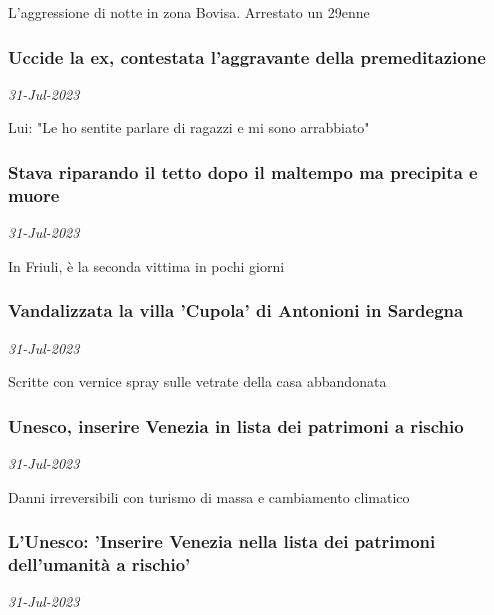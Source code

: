 L'aggressione di notte in zona Bovisa. Arrestato un 29enne
\subsubsection{Uccide la ex, contestata l'aggravante della premeditazione \href{https://www.ansa.it/sito/notizie/cronaca/2023/07/31/uccide-la-ex-contestata-laggravante-della-premeditazione_41bfe26d-d92d-487b-9baa-5a89bbd452da.html}{}}
\textit{31-Jul-2023}

Lui: "Le ho sentite parlare di ragazzi e mi sono arrabbiato"
\subsubsection{Stava riparando il tetto dopo il maltempo ma precipita e muore \href{https://www.ansa.it/sito/notizie/cronaca/2023/07/31/stava-riparando-il-tetto-dopo-il-maltempo-ma-precipita-e-muore_f71c618e-ea2d-432d-abe4-183ba84e5e6f.html}{}}
\textit{31-Jul-2023}

In Friuli, \`{e} la seconda vittima in pochi giorni
\subsubsection{Vandalizzata la villa 'Cupola' di Antonioni in Sardegna \href{https://www.ansa.it/sito/notizie/cronaca/2023/07/31/vandalizzata-la-villa-cupola-di-antonioni-in-sardegna_e3df485e-1e32-4f59-9fbf-521ad8ff5104.html}{}}
\textit{31-Jul-2023}

Scritte con vernice spray sulle vetrate della casa abbandonata
\subsubsection{Unesco, inserire Venezia in lista dei patrimoni a rischio \href{https://www.ansa.it/sito/notizie/cronaca/2023/07/31/unesco-inserire-venezia-in-lista-dei-patrimoni-a-rischio_cf326ad9-0f27-48e3-89d7-8673b0c62dc3.html}{}}
\textit{31-Jul-2023}

Danni irreversibili con turismo di massa e cambiamento climatico
\subsubsection{L'Unesco: 'Inserire Venezia nella lista dei patrimoni dell'umanit\`{a} a rischio' \href{https://www.ansa.it/sito/notizie/cronaca/2023/07/31/unesco-inserire-venezia-nella-lista-dei-patrimoni-a-rischio_db3cb0dd-4e8f-48c1-b0eb-de16792644b5.html}{}}
\textit{31-Jul-2023}


